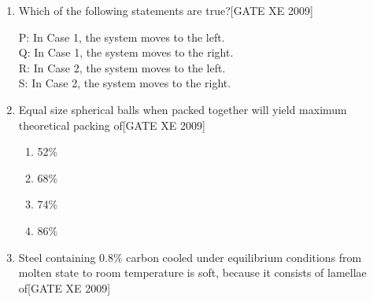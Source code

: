 \documentclass[journal,12pt,onecolumn]{IEEEtran}
\theoremstyle{remark}
\begin{document}
\begin{enumerate}
\begin{enumerate}
\end{enumerate}


\item Which of the following statements are true?\hfill[GATE XE 2009]

P: In Case 1, the system moves to the left.\\
Q: In Case 1, the system moves to the right.\\
R: In Case 2, the system moves to the left.\\
S: In Case 2, the system moves to the right.
\begin{enumerate}
\end{enumerate}











\item Equal size spherical balls when packed together will yield maximum theoretical packing of\hfill[GATE XE 2009]

\begin{multicols}{2}
\begin{enumerate}
    \item 52\%
    \item 68\%
    \item 74\%
    \item 86\%
\end{enumerate}
\end{multicols}



\item Steel containing 0.8\% carbon cooled under equilibrium conditions from molten state to room temperature is soft, because it consists of lamellae of\hfill[GATE XE 2009]


\end{enumerate}
\end{document}
